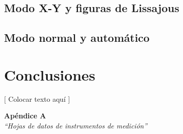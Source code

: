 \documentclass{article}
\begin{document}
\subsection{Modo X-Y y figuras de Lissajous}

\bigskip



\subsection{Modo normal y automático}

	

\bigskip\bigskip	




\section{Conclusiones}

	[ Colocar texto aquí ]
	\bigskip\bigskip





\newpage
\vspace*{4cm}
\begin{center}
	\textbf{\Huge{Apéndice A}} \\
	\bigskip\bigskip
	\Large{\textit{``Hojas de datos de instrumentos de medición''}}
\end{center}
\end{document}
